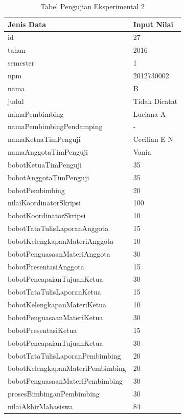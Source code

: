 	\begin{table}[H]
		\centering
		\caption{Tabel Pengujian Eksperimental 2}
		\begin{tabular}{| m{7cm} | m{5cm} |}
			\hline
			Jenis Data & Input Nilai\\
			\hline
			id & 27\\
			\hline
			tahun & 2016\\
			\hline
			semester & 1\\
			\hline
			npm & 2012730002\\
			\hline
			nama & B\\
			\hline
			judul & Tidak Dicatat \\
			\hline
			namaPembimbing & Luciana A\\
			\hline
			namaPembimbingPendamping & -\\
			\hline
			namaKetuaTimPenguji & Cecilian E N\\
			\hline
			namaAnggotaTimPenguji & Vania\\
			\hline
			bobotKetuaTimPenguji & 35\\
			\hline
			bobotAnggotaTimPenguji & 35\\
			\hline
			bobotPembimbing & 20\\
			\hline
			nilaiKoordinatorSkripsi & 100\\
			\hline
			bobotKoordinatorSkripsi & 10\\
			\hline
			bobotTataTulisLaporanAnggota & 15\\
			\hline
			bobotKelengkapanMateriAnggota & 10\\
			\hline
			bobotPenguasaanMateriAnggota & 30\\
			\hline
			bobotPresentasiAnggota & 15\\
			\hline
			bobotPencapaianTujuanKetua & 30\\
			\hline
			bobotTataTulisLaporanKetua & 15\\
			\hline
			bobotKelengkapanMateriKetua & 10\\
			\hline
			bobotPenguasaanMateriKetua & 30\\
			\hline
			bobotPresentasiKetua & 15\\
			\hline
			bobotPencapaianTujuanKetua & 30\\
			\hline
			bobotTataTulisLaporanPembimbing & 20\\
			\hline
			bobotKelengkapanMateriPembimbing &20\\
			\hline
			bobotPenguasaanMateriPembimbing & 30\\
			\hline
			prosesBimbinganPembimbing & 30\\
			\hline
			nilaiAkhirMahasiswa & 84\\
			\hline
		\end{tabular}
	\end{table}
